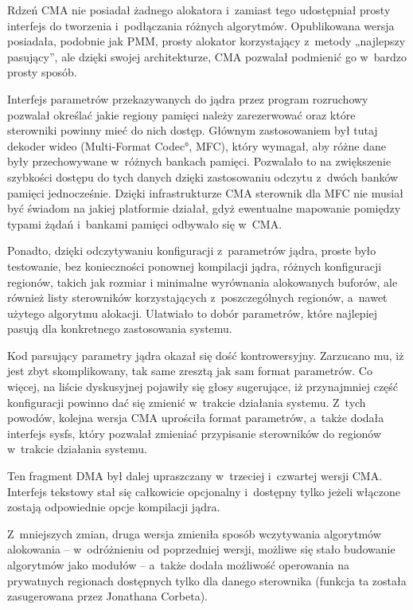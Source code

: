 Rdzeń CMA nie posiadał żadnego alokatora i~zamiast tego udostępniał
prosty interfejs do tworzenia i~podłączania różnych algorytmów.
Opublikowana wersja posiadała, podobnie jak PMM, prosty alokator
korzystający z~metody „najlepszy pasujący”, ale dzięki swojej
architekturze, CMA pozwalał podmienić go w~bardzo prosty sposób.

Interfejs parametrów przekazywanych do jądra przez program rozruchowy
pozwalał określać jakie regiony pamięci należy zarezerwować oraz które
sterowniki powinny mieć do nich dostęp.  Głównym zastosowaniem był
tutaj dekoder wideo (\ang{Multi-Format Codec}, MFC), który wymagał,
aby różne dane były przechowywane w~różnych bankach pamięci.
Pozwalało to na zwiększenie szybkości dostępu do tych danych dzięki
zastosowaniu odczytu z~dwóch banków pamięci jednocześnie.  Dzięki
infrastrukturze CMA sterownik dla MFC nie musiał być świadom na jakiej
platformie działał, gdyż ewentualne mapowanie pomiędzy typami żądań
i~bankami pamięci odbywało się w~CMA.

Ponadto, dzięki odczytywaniu konfiguracji z~parametrów jądra, proste
było testowanie, bez konieczności ponownej kompilacji jądra, różnych
konfiguracji regionów, takich jak rozmiar i minimalne wyrównania
alokowanych buforów, ale również listy sterowników korzystających
z~poszczególnych regionów, a~nawet użytego algorytmu alokacji.
Ułatwiało to dobór parametrów, które najlepiej pasują dla konkretnego
zastosowania systemu.

Kod parsujący parametry jądra okazał się dość kontrowersyjny.
Zarzucano mu, iż jest zbyt skomplikowany, tak same zresztą jak sam
format parametrów.  Co więcej, na liście dyskusyjnej pojawiły się
głosy sugerujące, iż przynajmniej część konfiguracji powinno dać się
zmienić w~trakcie działania systemu.  Z~tych powodów, kolejna wersja
CMA uprościła format parametrów, a~także dodała interfejs sysfs, który
pozwalał zmieniać przypisanie sterowników do regionów w~trakcie
działania systemu.

Ten fragment DMA był dalej upraszczany w~trzeciej i~czwartej wersji
CMA.  Interfejs tekstowy stał się całkowicie opcjonalny i~dostępny
tylko jeżeli włączone zostają odpowiednie opcje kompilacji jądra.

Z~mniejszych zmian, druga wersja zmieniła sposób wczytywania
algorytmów alokowania -- w~odróżnieniu od poprzedniej wersji, możliwe
się stało budowanie algorytmów jako modułów -- a~także dodała
możliwość operowania na prywatnych regionach dostępnych tylko dla
danego sterownika (funkcja ta została zasugerowana przez Jonathana
Corbeta).

